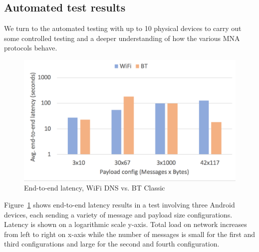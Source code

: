 \documentclass[conference]{IEEEtran}
\begin{document}
%
\subsection{Automated test results}
\label{sec:automated}
%
We turn to the automated testing with up to 10 physical devices to
carry out some controlled testing and a deeper understanding of how
the various MNA protocols behave.
%
\begin{figure}[htbp]
\centerline{\includegraphics[width=\columnwidth]{figs/variety_e2e_latency}}
\caption{End-to-end latency, WiFi DNS vs. BT Classic}
\label{fig:variety_e2e}
\end{figure}
%
Figure~\ref{fig:variety_e2e} shows end-to-end latency results in a test
involving three Android devices, each sending a variety of message and
payload size configurations. Latency is shown on a logarithmic scale
y-axis. Total load on network increases from left to right on
x-axis while the number of messages is small for the first and third
configurations and large for the second and fourth configuration. 
\end{document}
